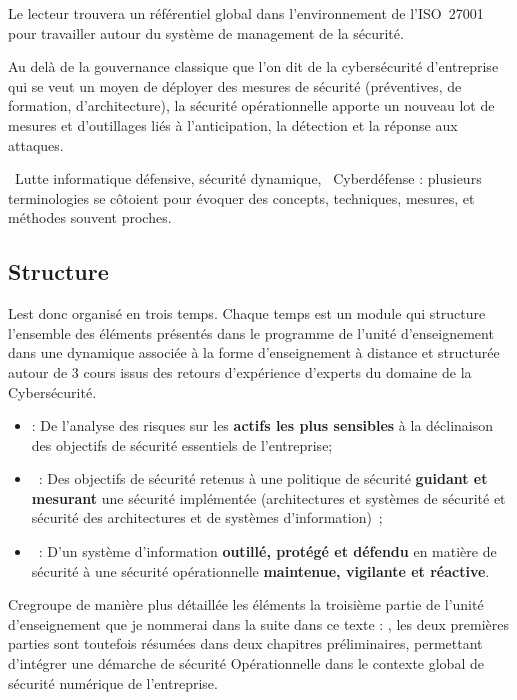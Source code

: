 Le lecteur trouvera un référentiel global dans l'environnement de l'ISO~27001 pour travailler autour du système de management de la sécurité.

Au delà de la gouvernance classique que l'on dit  de la cybersécurité d'entreprise qui se veut un moyen de déployer des mesures de sécurité (préventives, de formation, d'architecture), la sécurité opérationnelle apporte un nouveau lot de mesures et d'outillages liés à l'anticipation, la détection et la réponse aux attaques.

\begin{nota} Lutte informatique défensive, sécurité dynamique, 
Cyberdéfense : plusieurs terminologies se côtoient pour évoquer des concepts, techniques, mesures, et méthodes souvent proches. 
\end{nota}


\subsection{Structure}

L\ecours est donc organisé en trois temps. Chaque temps est un module qui structure l'ensemble des éléments présentés dans le programme de l'unité d'enseignement dans une dynamique associée à la forme d'enseignement à distance et structurée autour de 3 cours issus des retours d'expérience d'experts du domaine de la Cybersécurité.  
\begin{itemize}
\item {} : De l'analyse des risques sur les \textbf{actifs les plus sensibles} à la déclinaison des objectifs de sécurité essentiels de l'entreprise;
\item {} : Des objectifs de sécurité retenus à une politique de sécurité \textbf{guidant et mesurant }une sécurité implémentée (architectures et systèmes  de sécurité et sécurité des architectures et de systèmes d'information) ;
\item {} : D'un système d'information \textbf{outillé, protégé et défendu} en matière de sécurité à une sécurité opérationnelle \textbf{maintenue, vigilante et  réactive}.
\end{itemize}

C\edoc regroupe de manière plus détaillée les éléments la troisième partie de l'unité d'enseignement que je nommerai dans  la suite dans ce texte  : ,  les deux premières parties sont toutefois résumées dans deux chapitres préliminaires, permettant d'intégrer  une démarche de sécurité Opérationnelle dans le contexte global de sécurité numérique de l'entreprise.


